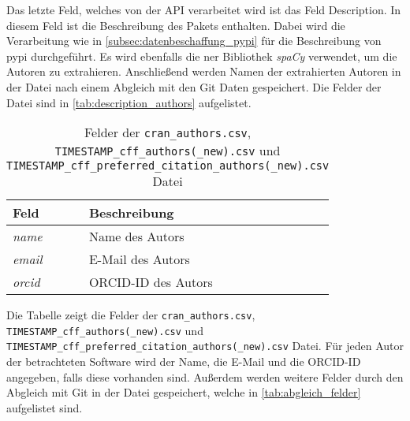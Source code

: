 Das letzte Feld, welches von der API verarbeitet wird ist das Feld \glqq Description\grqq{}.
In diesem Feld ist die Beschreibung des Pakets enthalten.
Dabei wird die Verarbeitung wie in \autoref{subsec:datenbeschaffung_pypi} für die Beschreibung von \gls{pypi} durchgeführt.
Es wird ebenfalls die \gls{ner} Bibliothek \emph{spaCy} verwendet, um die Autoren zu extrahieren.
Anschließend werden Namen der extrahierten Autoren in der Datei  nach einem Abgleich mit den Git Daten gespeichert.
Die Felder der Datei sind in \autoref{tab:description_authors} aufgelistet.

\begin{table}
    \centering
    \setlength{\tabcolsep}{8pt}
    \begin{tabular}{p{3.5cm}|p{10cm}}
        \toprule
        \textbf{Feld} & \textbf{Beschreibung} \\ \midrule
        \emph{name} & Name des Autors \\
        \emph{email} & E-Mail des Autors \\
        \emph{orcid} & ORCID-ID des Autors \\
        \bottomrule
    \end{tabular}
    \caption{Felder der \texttt{cran\_authors.csv}, \texttt{TIMESTAMP\_cff\_authors(\_new).csv} und \texttt{TIMESTAMP\_cff\_preferred\_citation\_authors(\_new).csv} Datei}
    \label{tab:cran_authors}
    \small
    \raggedright
    Die Tabelle zeigt die Felder der \texttt{cran\_authors.csv}, \texttt{TIMESTAMP\_cff\_authors(\_new).csv} und \texttt{TIMESTAMP\_cff\_preferred\_citation\_authors(\_new).csv} Datei. Für jeden Autor der betrachteten Software wird der Name, die E-Mail und die ORCID-ID angegeben, falls diese vorhanden sind. Außerdem werden weitere Felder durch den Abgleich mit Git in der Datei gespeichert, welche in \autoref{tab:abgleich_felder} aufgelistet sind.
\end{table}
